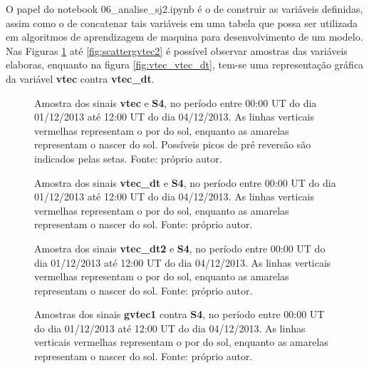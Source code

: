 O papel do notebook 06\_analise\_sj2.ipynb é o de construir as variáveis definidas, assim como o de concatenar tais variáveis em uma tabela que possa ser utilizada em algoritmos de aprendizagem de maquina para desenvolvimento de um modelo. Nas Figuras \ref{fig:scattervtec} até \ref{fig:scattergvtec2} é possível observar amostras das variáveis elaboras, enquanto na figura \ref{fig:vtec_vtec_dt}, tem-se uma representação gráfica da variável {\bf vtec} contra {\bf vtec\_dt}.

\begin{figure}[H]
\centering
{}

\caption{Amostra dos sinais {\bf vtec} e {\bf S4}, no período entre 00:00 UT do dia 01/12/2013 até 12:00 UT do dia 04/12/2013. As linhas verticais vermelhas representam o por do sol, enquanto as amarelas representam o nascer do sol. Possíveis picos de pré reversão são indicados pelas setas.  Fonte: próprio autor.}
\label{fig:scattervtec}
\end{figure}


\begin{figure}[H]
\centering
{}
\caption{Amostra dos sinais {\bf vtec\_dt} e {\bf S4}, no período entre 00:00 UT do dia 01/12/2013 até 12:00 UT do dia 04/12/2013. As linhas verticais vermelhas representam o por do sol, enquanto as amarelas representam o nascer do sol. Fonte: próprio autor.}
\label{fig:scattervtecdt}
\end{figure}

\begin{figure}[H]
\centering
{}
\caption{Amostra dos sinais {\bf vtec\_dt2} e {\bf S4}, no período entre 00:00 UT do dia 01/12/2013 até 12:00 UT do dia 04/12/2013. As linhas verticais vermelhas representam o por do sol, enquanto as amarelas representam o nascer do sol. Fonte: próprio autor.}
\label{fig:scattervtecdt2}
\end{figure}

\begin{figure}[H]
\centering
{}
\caption{Amostras dos sinais {\bf gvtec1} contra {\bf S4}, no período entre 00:00 UT do dia 01/12/2013 até 12:00 UT do dia 04/12/2013. As linhas verticais vermelhas representam o por do sol, enquanto as amarelas representam o nascer do sol. Fonte: próprio autor.}
\label{fig:scattergvtec1}
\end{figure}

